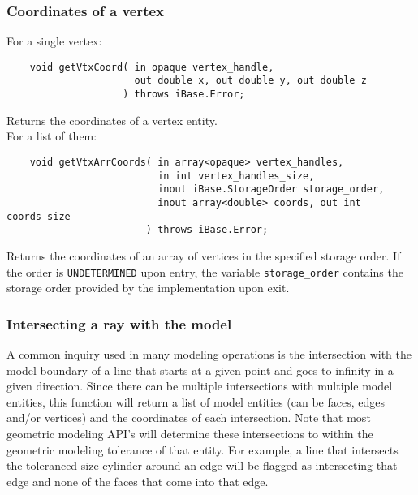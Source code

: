 \documentclass{article}
\begin{document}
\subsubsection{Coordinates of a vertex}
For a single vertex:

\begin{verbatim}
    void getVtxCoord( in opaque vertex_handle, 
                      out double x, out double y, out double z
                    ) throws iBase.Error;
\end{verbatim}
Returns the coordinates of a vertex entity.\\

\hspace{-16pt}For a list of them:

\begin{verbatim}
    void getVtxArrCoords( in array<opaque> vertex_handles, 
                          in int vertex_handles_size,
                          inout iBase.StorageOrder storage_order,
                          inout array<double> coords, out int coords_size
                        ) throws iBase.Error;
\end{verbatim}
Returns the coordinates of an array of vertices in the specified 
storage order. If the order is {\tt UNDETERMINED} upon entry, the variable
{\tt storage\_order} contains the storage order provided by the implementation upon
exit.

\subsubsection{Intersecting a ray with the model}
A common inquiry used in many modeling operations is the intersection 
with the model boundary of a line that starts at a given point and goes 
to infinity in a given direction. Since there can be multiple 
intersections with multiple model entities, this function will return a 
list of model entities (can be faces, edges and/or vertices) and the 
coordinates of each intersection. Note that most geometric modeling 
API's will determine these intersections to within the geometric 
modeling tolerance of that entity. For example, a line that intersects 
the toleranced size cylinder around an edge will be flagged as 
intersecting that edge and none of the faces that come into that edge.\\
\end{document}

